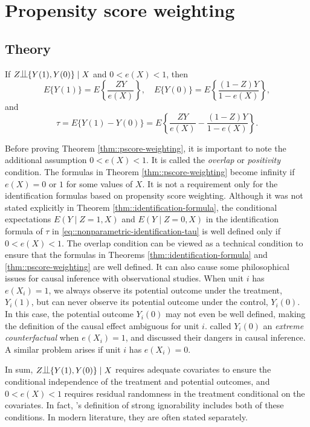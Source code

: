 \section{Propensity score weighting}

\subsection{Theory}

\begin{theorem}
\label{thm::pscore-weighting}
If $Z\ind \{ Y(1), Y(0)  \} \mid X$ and $0<e(X)<1$, then
$$
E\{  Y(1) \} =  E\left\{  \frac{ZY}{e(X)}  \right\},\quad
E\{  Y(0) \} =  E\left\{  \frac{(1-Z)Y}{1-e(X)}  \right\} ,
$$
and
$$
\tau = E\{  Y(1) -  Y(0) \} =  E\left\{  \frac{ZY}{e(X)} - \frac{(1-Z)Y}{1-e(X)}   \right\} .
$$
\end{theorem}


Before proving Theorem \ref{thm::pscore-weighting}, it is important to note the additional assumption $0<e(X)<1$. It is called the {\it overlap} or {\it positivity} condition. The formulas in Theorem \ref{thm::pscore-weighting} become infinity if $e(X)=0$ or $1$ for some values of $X$. It is not a requirement only for the identification formulas based on propensity score weighting. Although it was not stated explicitly in Theorem \ref{thm::identification-formula}, the conditional expectations $E(Y\mid Z=1, X)$ and $ E(Y\mid Z=0, X)$ in the identification formula of $\tau$ in \eqref{eq::nonparametric-identification-tau} is well defined only if $0< e(X) < 1$. The overlap condition can be viewed as a technical condition to ensure that the formulas in Theorems \ref{thm::identification-formula} and \ref{thm::pscore-weighting} are well defined. It can also cause some philosophical issues for causal inference with observational studies. When unit $i$ has $e(X_i)=1$, we always observe its potential outcome under the treatment, $Y_i(1)$, but can never observe its potential outcome under the control, $Y_i(0)$. In this case, the potential outcome $Y_i(0)$ may not even be well defined, making the definition of the causal effect ambiguous for unit $i$. \citet{king2006dangers} called $Y_i(0)$ an {\it extreme counterfactual} when $e(X_i)=1$, and discussed their dangers in causal inference. A similar problem arises if unit $i$ has $e(X_i)=0$. 
 
 
In sum,  $Z\ind \{ Y(1), Y(0)  \} \mid X$ requires adequate covariates to ensure the conditional independence of the treatment and potential outcomes, and $0<e(X)<1$ requires residual randomness in the treatment conditional on the covariates. In fact, \citet{rosenbaum1983central}'s definition of strong ignorability includes both of these conditions. In modern literature, they are often stated separately. 
 


